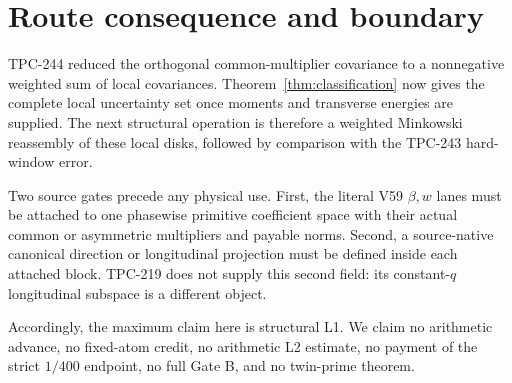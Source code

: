 \section{Route consequence and boundary}

TPC-244 reduced the orthogonal common-multiplier covariance to a nonnegative
weighted sum of local covariances.  Theorem~\ref{thm:classification} now gives
the complete local uncertainty set once moments and transverse energies are
supplied.  The next structural operation is therefore a weighted Minkowski
reassembly of these local disks, followed by comparison with the TPC-243
hard-window error.

Two source gates precede any physical use.  First, the literal V59 $\beta,w$
lanes must be attached to one phasewise primitive coefficient space with their
actual common or asymmetric multipliers and payable norms.  Second, a
source-native canonical direction or longitudinal projection must be defined
inside each attached block.  TPC-219 does not supply this second field: its
constant-$q$ longitudinal subspace is a different object.

Accordingly, the maximum claim here is structural L1.  We claim no arithmetic
advance, no fixed-atom credit, no arithmetic L2 estimate, no payment of the
strict $1/400$ endpoint, no full Gate B, and no twin-prime theorem.
